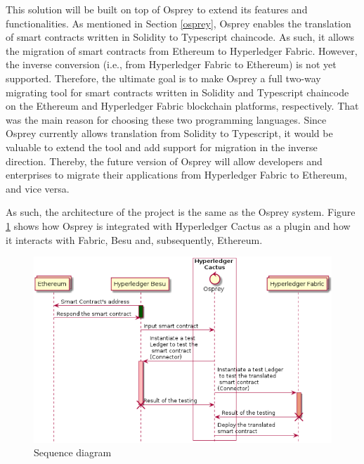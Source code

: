 \documentclass[runningheads]{llncs}
\begin{document}
This solution will be built on top of Osprey to extend its features and functionalities. As mentioned in Section \ref{osprey}, Osprey enables the translation of smart contracts written in Solidity to Typescript chaincode. As such, it allows the migration of smart contracts from Ethereum to Hyperledger Fabric. However, the inverse conversion (i.e., from Hyperledger Fabric to Ethereum) is not yet supported. Therefore, the ultimate goal is to make Osprey a full two-way migrating tool for smart contracts written in Solidity and Typescript chaincode on the Ethereum and Hyperledger Fabric blockchain platforms, respectively. That was the main reason for choosing these two programming languages. Since Osprey currently allows translation from Solidity to Typescript, it would be valuable to extend the tool and add support for migration in the inverse direction. Thereby, the future version of Osprey will allow developers and enterprises to migrate their applications from Hyperledger Fabric to Ethereum, and vice versa.

As such, the architecture of the project is the same as the Osprey system. Figure \ref{fig:sequence} shows how Osprey is integrated with Hyperledger Cactus as a plugin and how it interacts with Fabric, Besu and, subsequently, Ethereum.

\begin{figure}
  \vspace{-2mm}
  \includegraphics[scale=0.45]{sequence.png}
  \centering
  \caption{Sequence diagram \protect\cite{abrunhosa_2021}}
  \label{fig:sequence}
  \vspace{-2mm}
\end{figure}
\end{document}
